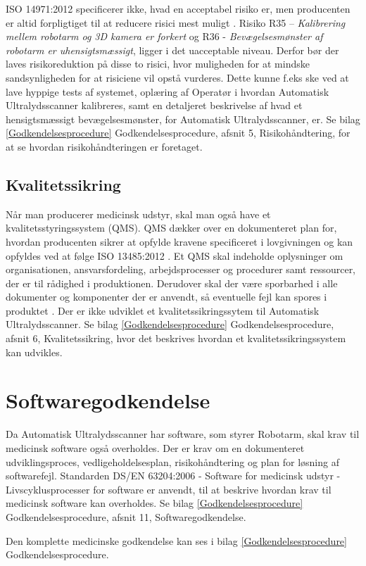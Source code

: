 ISO 14971:2012 specificerer ikke, hvad en acceptabel risiko er, men producenten er altid forpligtiget til at reducere risici mest muligt \cite{14971}. Risiko R35 – \textit{Kalibrering mellem robotarm og 3D kamera er forkert} og R36 - \textit{Bevægelsesmønster af robotarm er uhensigtsmæssigt}, ligger i det uacceptable niveau. Derfor bør der laves risikoreduktion på disse to risici, hvor muligheden for at mindske sandsynligheden for at risiciene vil opstå vurderes. Dette kunne f.eks ske ved at lave hyppige tests af systemet, oplæring af Operatør i hvordan Automatisk Ultralydsscanner kalibreres, samt en detaljeret beskrivelse af hvad et hensigtsmæssigt bevægelsesmønster, for Automatisk Ultralydsscanner, er. Se bilag \ref{Godkendelsesprocedure} Godkendelsesprocedure, afsnit 5, Risikohåndtering, for at se hvordan risikohåndteringen er foretaget. 

\subsection{Kvalitetssikring}
Når man producerer medicinsk udstyr, skal man også have et kvalitetsstyringssystem (QMS). QMS dækker over en dokumenteret plan for, hvordan producenten sikrer at opfylde kravene specificeret i lovgivningen og kan opfyldes ved at følge ISO 13485:2012 \cite{13485}. Et QMS skal indeholde oplysninger om organisationen, ansvarsfordeling, arbejdsprocesser og procedurer samt ressourcer, der er til rådighed i produktionen. Derudover skal der være sporbarhed i alle dokumenter og komponenter der er anvendt, så eventuelle fejl kan spores i produktet \cite{13485}.
Der er ikke udviklet et kvalitetssikringssytem til Automatisk Ultralydsscanner. Se bilag \ref {Godkendelsesprocedure} Godkendelsesprocedure, afsnit 6, Kvalitetssikring, hvor det beskrives hvordan et kvalitetssikringssystem kan udvikles. 

\section{Softwaregodkendelse}
Da Automatisk Ultralydsscanner har software, som styrer Robotarm, skal krav til medicinsk software også overholdes. Der er krav om en dokumenteret udviklingsproces, vedligeholdelsesplan, risikohåndtering og plan for løsning af softwarefejl. Standarden DS/EN 63204:2006 - Software for medicinsk udstyr - Livscyklusprocesser for software \cite{software} er anvendt, til at beskrive hvordan krav til medicinsk software kan overholdes. Se bilag \ref {Godkendelsesprocedure} Godkendelsesprocedure, afsnit 11, Softwaregodkendelse.

Den komplette medicinske godkendelse kan ses i bilag \ref {Godkendelsesprocedure} Godkendelsesprocedure.
